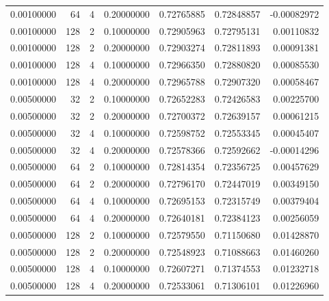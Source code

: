 \begin{table}[htbp]
{\begin{tabular}{rrrrrrr}
0.00100000 & 64 & 4 & 0.20000000 & 0.72765885 & 0.72848857 & -0.00082972 \\
0.00100000 & 128 & 2 & 0.10000000 & 0.72905963 & 0.72795131 & 0.00110832 \\
0.00100000 & 128 & 2 & 0.20000000 & 0.72903274 & 0.72811893 & 0.00091381 \\
0.00100000 & 128 & 4 & 0.10000000 & 0.72966350 & 0.72880820 & 0.00085530 \\
0.00100000 & 128 & 4 & 0.20000000 & 0.72965788 & 0.72907320 & 0.00058467 \\
0.00500000 & 32 & 2 & 0.10000000 & 0.72652283 & 0.72426583 & 0.00225700 \\
0.00500000 & 32 & 2 & 0.20000000 & 0.72700372 & 0.72639157 & 0.00061215 \\
0.00500000 & 32 & 4 & 0.10000000 & 0.72598752 & 0.72553345 & 0.00045407 \\
0.00500000 & 32 & 4 & 0.20000000 & 0.72578366 & 0.72592662 & -0.00014296 \\
0.00500000 & 64 & 2 & 0.10000000 & 0.72814354 & 0.72356725 & 0.00457629 \\
0.00500000 & 64 & 2 & 0.20000000 & 0.72796170 & 0.72447019 & 0.00349150 \\
0.00500000 & 64 & 4 & 0.10000000 & 0.72695153 & 0.72315749 & 0.00379404 \\
0.00500000 & 64 & 4 & 0.20000000 & 0.72640181 & 0.72384123 & 0.00256059 \\
0.00500000 & 128 & 2 & 0.10000000 & 0.72579550 & 0.71150680 & 0.01428870 \\
0.00500000 & 128 & 2 & 0.20000000 & 0.72548923 & 0.71088663 & 0.01460260 \\
0.00500000 & 128 & 4 & 0.10000000 & 0.72607271 & 0.71374553 & 0.01232718 \\
0.00500000 & 128 & 4 & 0.20000000 & 0.72533061 & 0.71306101 & 0.01226960 \\
\hline
\end{tabular}
}
\end{table}
